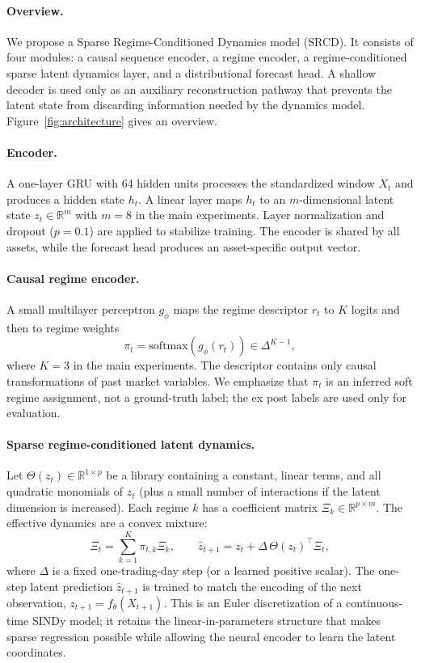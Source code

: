 \documentclass{article}
\begin{document}
\paragraph{Overview.}
We propose a Sparse Regime-Conditioned Dynamics model (SRCD). It consists of four modules: a causal sequence encoder, a regime encoder, a regime-conditioned sparse latent dynamics layer, and a distributional forecast head. A shallow decoder is used only as an auxiliary reconstruction pathway that prevents the latent state from discarding information needed by the dynamics model. Figure~\ref{fig:architecture} gives an overview.

\paragraph{Encoder.}
A one-layer GRU with 64 hidden units processes the standardized window $X_t$ and produces a hidden state $h_t$. A linear layer maps $h_t$ to an $m$-dimensional latent state $z_t \in \mathbb{R}^{m}$ with $m=8$ in the main experiments. Layer normalization and dropout ($p=0.1$) are applied to stabilize training. The encoder is shared by all assets, while the forecast head produces an asset-specific output vector.

\paragraph{Causal regime encoder.}
A small multilayer perceptron $g_\phi$ maps the regime descriptor $r_t$ to $K$ logits and then to regime weights
\begin{equation}
  \pi_t = \mathrm{softmax}(g_\phi(r_t)) \in \Delta^{K-1},
\end{equation}
where $K=3$ in the main experiments. The descriptor contains only causal transformations of past market variables. We emphasize that $\pi_t$ is an inferred soft regime assignment, not a ground-truth label; the ex post labels are used only for evaluation.

\paragraph{Sparse regime-conditioned latent dynamics.}
Let $\Theta(z_t) \in \mathbb{R}^{1 \times p}$ be a library containing a constant, linear terms, and all quadratic monomials of $z_t$ (plus a small number of interactions if the latent dimension is increased). Each regime $k$ has a coefficient matrix $\Xi_k \in \mathbb{R}^{p \times m}$. The effective dynamics are a convex mixture:
\begin{equation}
  \Xi_t = \sum_{k=1}^{K} \pi_{t,k} \Xi_k,
  \qquad
  \hat{z}_{t+1} = z_t + \Delta\, \Theta(z_t)^\top \Xi_t,
  \label{eq:dynamics}
\end{equation}
where $\Delta$ is a fixed one-trading-day step (or a learned positive scalar). The one-step latent prediction $\hat{z}_{t+1}$ is trained to match the encoding of the next observation, $z_{t+1}=f_\theta(X_{t+1})$. This is an Euler discretization of a continuous-time SINDy model; it retains the linear-in-parameters structure that makes sparse regression possible while allowing the neural encoder to learn the latent coordinates.
\end{document}
